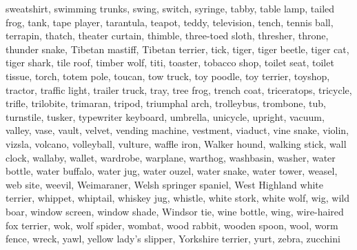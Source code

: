 sweatshirt, swimming trunks, swing, switch, syringe, tabby, table lamp, tailed frog, tank, tape player, tarantula, teapot, teddy, television, tench, tennis ball, terrapin, thatch, theater curtain, thimble, three-toed sloth, thresher, throne, thunder snake, Tibetan mastiff, Tibetan terrier, tick, tiger, tiger beetle, tiger cat, tiger shark, tile roof, timber wolf, titi, toaster, tobacco shop, toilet seat, toilet tissue, torch, totem pole, toucan, tow truck, toy poodle, toy terrier, toyshop, tractor, traffic light, trailer truck, tray, tree frog, trench coat, triceratops, tricycle, trifle, trilobite, trimaran, tripod, triumphal arch, trolleybus, trombone, tub, turnstile, tusker, typewriter keyboard, umbrella, unicycle, upright, vacuum, valley, vase, vault, velvet, vending machine, vestment, viaduct, vine snake, violin, vizsla, volcano, volleyball, vulture, waffle iron, Walker hound, walking stick, wall clock, wallaby, wallet, wardrobe, warplane, warthog, washbasin, washer, water bottle, water buffalo, water jug, water ouzel, water snake, water tower, weasel, web site, weevil, Weimaraner, Welsh springer spaniel, West Highland white terrier, whippet, whiptail, whiskey jug, whistle, white stork, white wolf, wig, wild boar, window screen, window shade, Windsor tie, wine bottle, wing, wire-haired fox terrier, wok, wolf spider, wombat, wood rabbit, wooden spoon, wool, worm fence, wreck, yawl, yellow lady's slipper, Yorkshire terrier, yurt, zebra, zucchini